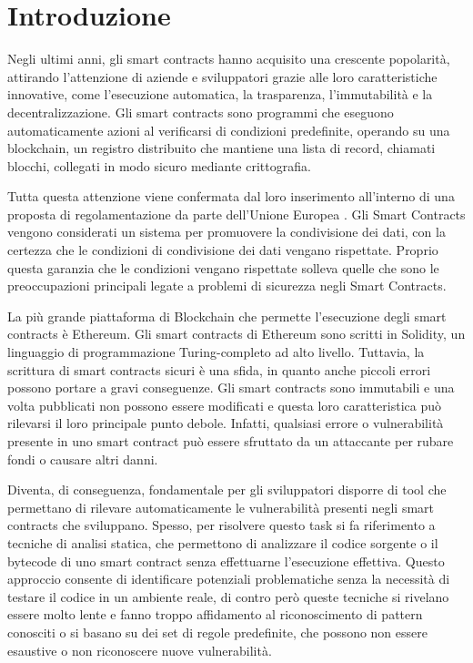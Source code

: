 \documentclass[../../Thesis.tex]{subfiles}
\begin{document}
\chapter{Introduzione}
Negli ultimi anni, gli smart contracts hanno acquisito una crescente popolarità, attirando l'attenzione di aziende e sviluppatori grazie alle loro caratteristiche innovative, come l'esecuzione automatica, la trasparenza, l'immutabilità e la decentralizzazione. Gli smart contracts sono programmi che eseguono automaticamente azioni al verificarsi di condizioni predefinite, operando su una blockchain, un registro distribuito che mantiene una lista di record, chiamati blocchi, collegati in modo sicuro mediante crittografia.

Tutta questa attenzione viene confermata dal loro inserimento all'interno di una proposta di regolamentazione da parte dell'Unione Europea \cite{DataAct}. Gli Smart Contracts vengono considerati un sistema per promuovere la condivisione dei dati, con la certezza che le condizioni di condivisione dei dati vengano rispettate. Proprio questa garanzia che le condizioni vengano rispettate solleva quelle che sono le preoccupazioni principali legate a problemi di sicurezza negli Smart Contracts.

La più grande piattaforma di Blockchain che permette l'esecuzione degli smart contracts è Ethereum. Gli smart contracts di Ethereum sono scritti in Solidity, un linguaggio di programmazione Turing-completo ad alto livello. Tuttavia, la scrittura di smart contracts sicuri è una sfida, in quanto anche piccoli errori possono portare a gravi conseguenze. Gli smart contracts sono immutabili e una volta pubblicati non possono essere modificati e questa loro caratteristica può rilevarsi il loro principale punto debole. Infatti, qualsiasi errore o vulnerabilità presente in uno smart contract può essere sfruttato da un attaccante per rubare fondi o causare altri danni.

Diventa, di conseguenza, fondamentale per gli sviluppatori disporre di tool che permettano di rilevare automaticamente le vulnerabilità presenti negli smart contracts che sviluppano. Spesso, per risolvere questo task si fa riferimento a tecniche di analisi statica, che permettono di analizzare il codice sorgente o il bytecode di uno smart contract senza effettuarne l'esecuzione effettiva. Questo approccio consente di identificare potenziali problematiche senza la necessità di testare il codice in un ambiente reale, di contro però queste tecniche si rivelano essere molto lente e fanno troppo affidamento al riconoscimento di pattern conosciti o si basano su dei set di regole predefinite, che possono non essere esaustive o non riconoscere nuove vulnerabilità. 
\end{document}
